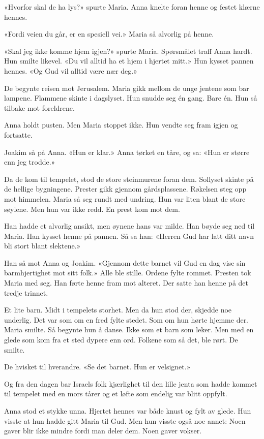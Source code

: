 «Hvorfor skal de ha lys?» spurte Maria.
Anna knelte foran henne og festet klærne hennes.

«Fordi veien du går, er en spesiell vei.»
Maria så alvorlig på henne.

«Skal jeg ikke komme hjem igjen?» spurte Maria.
Spørsmålet traff Anna hardt.
Hun smilte likevel.
«Du vil alltid ha et hjem i hjertet mitt.»
Hun kysset pannen hennes.
«Og Gud vil alltid være nær deg.»

De begynte reisen mot Jerusalem.
Maria gikk mellom de unge jentene som bar lampene.
Flammene skinte i dagslyset.
Hun snudde seg én gang.
Bare én.
Hun så tilbake mot foreldrene.

Anna holdt pusten.
Men Maria stoppet ikke.
Hun vendte seg fram igjen og fortsatte.

Joakim så på Anna. «Hun er klar.»
Anna tørket en tåre, og sa: «Hun er større enn jeg trodde.»

Da de kom til tempelet, stod de store steinmurene foran dem.
Sollyset skinte på de hellige bygningene.
Prester gikk gjennom gårdsplassene.
Røkelsen steg opp mot himmelen.
Maria så seg rundt med undring.
Hun var liten blant de store søylene.
Men hun var ikke redd.
En prest kom mot dem.

Han hadde et alvorlig ansikt, men øynene hans var milde.
Han bøyde seg ned til Maria.
Han kysset henne på pannen. Så sa han:
«Herren Gud har latt ditt navn bli stort blant slektene.»

Han så mot Anna og Joakim.
«Gjennom dette barnet vil Gud en dag vise sin barmhjertighet mot sitt folk.»
Alle ble stille.
Ordene fylte rommet.
Presten tok Maria med seg.
Han førte henne fram mot alteret.
Der satte han henne på det tredje trinnet.

Et lite barn.
Midt i tempelets storhet.
Men da hun stod der, skjedde noe underlig.
Det var som om en fred fylte stedet.
Som om hun hørte hjemme der.
Maria smilte.
Så begynte hun å danse.
Ikke som et barn som leker.
Men med en glede som kom fra et sted dypere enn ord.
Folkene som så det, ble rørt.
De smilte.

De hvisket til hverandre.
«Se det barnet. Hun er velsignet.»

Og fra den dagen bar Israels folk kjærlighet til
den lille jenta som hadde kommet til tempelet
med en mors tårer og et løfte som endelig var blitt oppfylt.

Anna stod et stykke unna.
Hjertet hennes var både knust og fylt av glede.
Hun visste at hun hadde gitt Maria til Gud.
Men hun visste også noe annet:
Noen gaver blir ikke mindre fordi man deler dem.
Noen gaver vokser.


